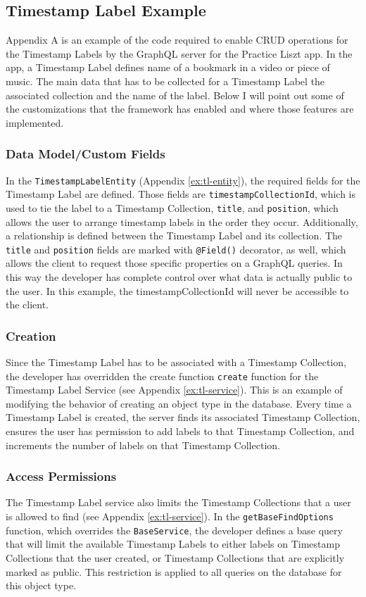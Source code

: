 \subsection{Timestamp Label Example}
Appendix A is an example of the code required to enable CRUD operations for the Timestamp Labels by the GraphQL server for the Practice Liszt app.  In the app, a Timestamp Label defines name of a bookmark in a video or piece of music.  The main data that has to be collected for a Timestamp Label the associated collection and the name of the label.  Below I will point out some of the customizations that the framework has enabled and where those features are implemented.

\subsubsection{Data Model/Custom Fields}
In the \verb!TimestampLabelEntity! (Appendix \ref{ex:tl-entity}), the required fields for the Timestamp Label are defined.  Those fields are \verb!timestampCollectionId!, which is used to tie the label to a Timestamp Collection, \verb!title!, and \verb!position!, which allows the user to arrange timestamp labels in the order they occur.  Additionally, a relationship is defined between the Timestamp Label and its collection.  The \verb!title! and \verb!position! fields are marked with \verb!@Field()! decorator, as well, which allows the client to request those specific properties on a GraphQL queries.  In this way the developer has complete control over what data is actually public to the user.  In this example, the timestampCollectionId will never be accessible to the client.

\subsubsection{Creation}
Since the Timestamp Label has to be associated with a Timestamp Collection, the developer has overridden the create function \verb!create! function for the Timestamp Label Service (see Appendix \ref{ex:tl-service}). This is an example of modifying the behavior of creating an object type in the database.  Every time a Timestamp Label is created, the server finds its associated Timestamp Collection, ensures the user has permission to add labels to that Timestamp Collection, and increments the number of labels on that Timestamp Collection.

\subsubsection{Access Permissions}
The Timestamp Label service also limits the Timestamp Collections that a user is allowed to find (see Appendix \ref{ex:tl-service}).  In the \verb!getBaseFindOptions! function, which overrides the \verb!BaseService!, the developer defines a base query that will limit the available Timestamp Labels to either labels on Timestamp Collections that the user created, or Timestamp Collections that are explicitly marked as public.  This restriction is applied to all queries on the database for this object type.

